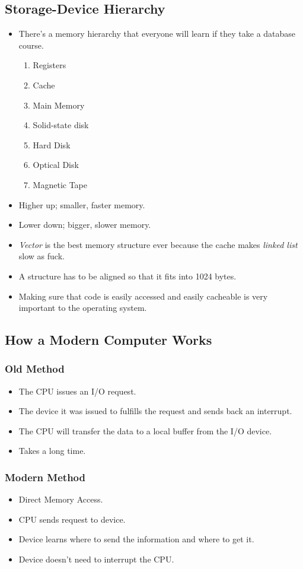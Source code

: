 \documentclass[]{article}
\begin{document}
\subsection{Storage-Device Hierarchy}
\begin{itemize}
\item There's a memory hierarchy that everyone will learn if they take a
database course.
\begin{enumerate}
\item Registers
\item Cache
\item Main Memory
\item Solid-state disk
\item Hard Disk
\item Optical Disk
\item Magnetic Tape
\end{enumerate}
\item Higher up; smaller, faster memory.
\item Lower down; bigger, slower memory.
\item \emph{Vector} is the best memory structure ever because the cache makes
\emph{linked list} slow as fuck.
\item A structure has to be aligned so that it fits into 1024 bytes.
\item Making sure that code is easily accessed and easily cacheable is very
important to the operating system.
\end{itemize}

\subsection{How a Modern Computer Works}
\subsubsection{Old Method}
\begin{itemize}
\item The CPU issues an I/O request.
\item The device it was issued to fulfills the request and sends back an
interrupt.
\item The CPU will transfer the data to a local buffer from the I/O device.
\item Takes a long time.
\end{itemize}

\subsubsection{Modern Method}
\begin{itemize}
\item Direct Memory Access.
\item CPU sends request to device.
\item Device learns where to send the information and where to get it.
\item Device doesn't need to interrupt the CPU.
\end{itemize}
\end{document}
